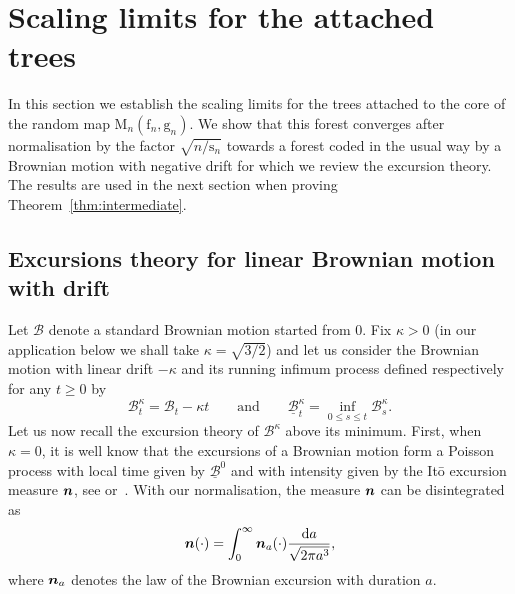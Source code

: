 \documentclass[JEP,XML,SOM,Unicode,NoFloatCountersInSection,NoEqCountersInSection]{cedram}
\newcommand{\bmn}{\protect\boldsymbol{n}}
\theoremstyle{plain}
\theoremstyle{definition}
\theoremstyle{remark}
\renewcommand{\d}{\mathop{}\!\mathrm{d}}
\newcommand{\Map}{\mathrm{M}}
\newcommand{\face}{\mathrm{f}}
\newcommand{\gen}{\mathrm{g}}
\newcommand{\spar}{\mathrm{s}}
\begin{document}
\section{Scaling limits for the attached trees}
\label{sec:contour}

In this section we establish the scaling limits for the trees attached to the core of the random map $\Map_n(\face_n, \gen_n)$.
We show that this forest converges after normalisation by the factor $ \sqrt{n/\spar_n}$ towards a forest coded in the usual way by a Brownian motion with negative drift for which we review the excursion theory. The results are used in the next section when proving Theorem~\ref{thm:intermediate}.

\subsection{Excursions theory for linear Brownian motion with drift}
\label{sec:excursionBMD}

Let $\mathcal{B}$ denote a standard Brownian motion started from $0$. Fix $\kappa >0$ (in our application below we shall take $\kappa = \sqrt{3/2}$) and let us consider the Brownian motion with linear drift $-\kappa$ and its running infimum process defined respectively for any $t \ge 0$ by
\[
\mathcal{B}^{\kappa}_{t} = \mathcal{B}_{t}-\kappa t
\qquad\text{and}\qquad
\underline{\mathcal{B}}^{\kappa}_{t} = \inf_{0 \leq s\leq t} \mathcal{B}^{\kappa}_{s}.
\]
Let us now recall the excursion theory of $\mathcal{B}^{\kappa}$ above its minimum.
First, when $\kappa=0$, it is well know that the excursions of a Brownian motion form a Poisson process with local time given by $\underline{\mathcal{B}}^{0}$ and with intensity given by the It\={o} excursion measure $\bmn$, see \eg \cite{LG10} or~\cite[Chap.\,XII]{RY99}. With our normalisation, the measure $\bmn$ can be disintegrated as
\[
\bmn(\cdot) = \int_0^\infty \bmn_a(\cdot) \frac{\d a}{\sqrt{2\pi a^3}},
\]
where $\bmn_a$ denotes the law of the Brownian excursion with duration $a$.
\end{document}
